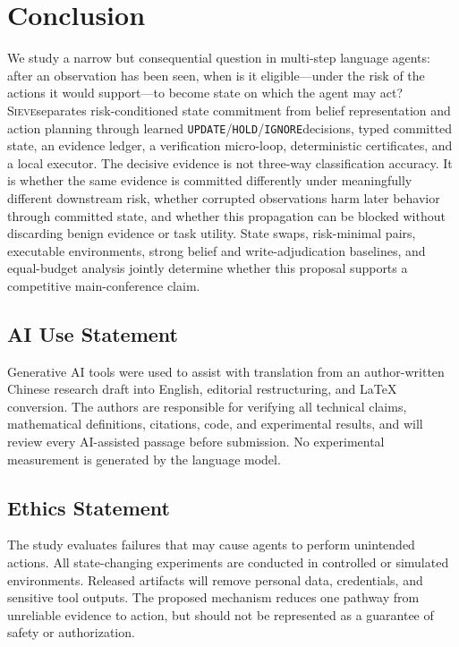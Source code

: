\documentclass{article}
\newcommand{\method}{\textsc{Sieve}}
\newcommand{\update}{\texttt{UPDATE}}
\newcommand{\hold}{\texttt{HOLD}}
\newcommand{\ignore}{\texttt{IGNORE}}
\begin{document}
\section{Conclusion}
\label{sec:conclusion}

We study a narrow but consequential question in multi-step language agents: after an observation has been seen, when is it eligible---under the risk of the actions it would support---to become state on which the agent may act? \method separates risk-conditioned state commitment from belief representation and action planning through learned \update/\hold/\ignore decisions, typed committed state, an evidence ledger, a verification micro-loop, deterministic certificates, and a local executor. The decisive evidence is not three-way classification accuracy. It is whether the same evidence is committed differently under meaningfully different downstream risk, whether corrupted observations harm later behavior through committed state, and whether this propagation can be blocked without discarding benign evidence or task utility. State swaps, risk-minimal pairs, executable environments, strong belief and write-adjudication baselines, and equal-budget analysis jointly determine whether this proposal supports a competitive main-conference claim.

\subsection*{AI Use Statement}

Generative AI tools were used to assist with translation from an author-written Chinese research draft into English, editorial restructuring, and LaTeX conversion. The authors are responsible for verifying all technical claims, mathematical definitions, citations, code, and experimental results, and will review every AI-assisted passage before submission. No experimental measurement is generated by the language model.

\subsection*{Ethics Statement}

The study evaluates failures that may cause agents to perform unintended actions. All state-changing experiments are conducted in controlled or simulated environments. Released artifacts will remove personal data, credentials, and sensitive tool outputs. The proposed mechanism reduces one pathway from unreliable evidence to action, but should not be represented as a guarantee of safety or authorization.
\end{document}
